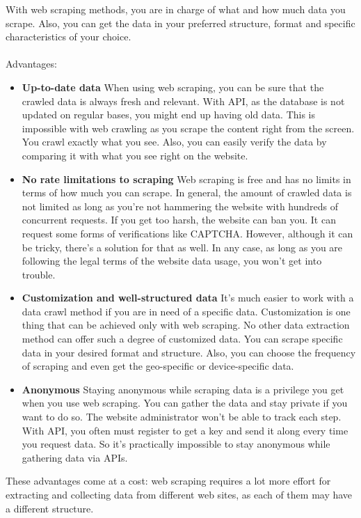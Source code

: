 \documentclass[10pt,a4paper]{article}
\newcommand{\nline}{\\~\\}
\begin{document}
With web scraping methods, you are in charge of what and how much data you scrape. Also, you can get the data in your preferred structure, format and specific characteristics of your choice.
\nline
Advantages:
\begin{itemize}
	\item \textbf{Up-to-date data}
When using web scraping, you can be sure that the crawled data is always fresh and relevant. With API, as the database is not updated on regular bases, you might end up having old data. This is impossible with web crawling as you scrape the content right from the screen. You crawl exactly what you see. Also, you can easily verify the data by comparing it with what you see right on the website.
	\item \textbf{No rate limitations to scraping}
Web scraping is free and has no limits in terms of how much you can scrape. In general, the amount of crawled data is not limited as long as you’re not hammering the website with hundreds of concurrent requests. If you get too harsh, the website can ban you. It can request some forms of verifications like CAPTCHA. However, although it can be tricky, there’s a solution for that as well. In any case, as long as you are following the legal terms of the website data usage, you won’t get into trouble.
	\item \textbf{Customization and well-structured data}
It’s much easier to work with a data crawl method if you are in need of a specific data. Customization is one thing that can be achieved only with web scraping. No other data extraction method can offer such a degree of customized data. You can scrape specific data in your desired format and structure. Also, you can choose the frequency of scraping and even get the geo-specific or device-specific data.
	\item \textbf{Anonymous}
Staying anonymous while scraping data is a privilege you get when you use web scraping. You can gather the data and stay private if you want to do so. The website administrator won’t be able to track each step. With API, you often must register to get a key and send it along every time you request data. So it’s practically impossible to stay anonymous while gathering data via APIs.
\end{itemize}
These advantages come at a cost: web scraping requires a lot more effort for extracting and collecting data from different web sites, as each of them may have a different structure.
\end{document}
